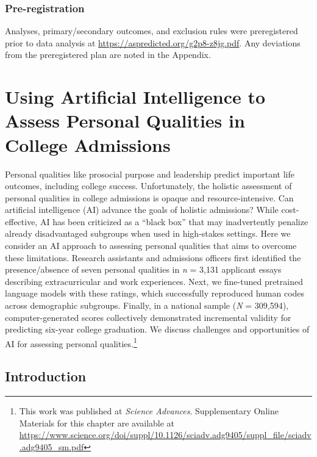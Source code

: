 \documentclass[11pt]{report}
\begin{document}
\begin{mainf}
\subsection*{Pre-registration}
Analyses, primary/secondary outcomes, and exclusion rules were preregistered prior to data analysis at \url{https://aspredicted.org/g2p8-z8jg.pdf}.
Any deviations from the preregistered plan are noted in the Appendix.

\chapter{Using Artificial Intelligence to Assess Personal Qualities in College Admissions}

Personal qualities like prosocial purpose and leadership predict important life outcomes, including college success. Unfortunately, the holistic assessment of personal qualities in college admissions is opaque and resource-intensive. Can artificial intelligence (AI) advance the goals of holistic admissions? While cost-effective, AI has been criticized as a “black box” that may inadvertently penalize already disadvantaged subgroups when used in high-stakes settings. Here we consider an AI approach to assessing personal qualities that aims to overcome these limitations. Research assistants and admissions officers first identified the presence/absence of seven personal qualities in \textit{n} = 3,131 applicant essays describing extracurricular and work experiences. Next, we fine-tuned pretrained language models with these ratings, which successfully reproduced human codes across demographic subgroups. Finally, in a national sample (\textit{N} = 309,594), computer-generated scores collectively demonstrated incremental validity for predicting six-year college graduation. We discuss challenges and opportunities of AI for assessing personal qualities.\footnote{This work was published at \textit{Science Advances}. Supplementary Online Materials for this chapter are available at \url{https://www.science.org/doi/suppl/10.1126/sciadv.adg9405/suppl_file/sciadv.adg9405_sm.pdf}}


\section{Introduction}


\end{mainf}
\end{document}
